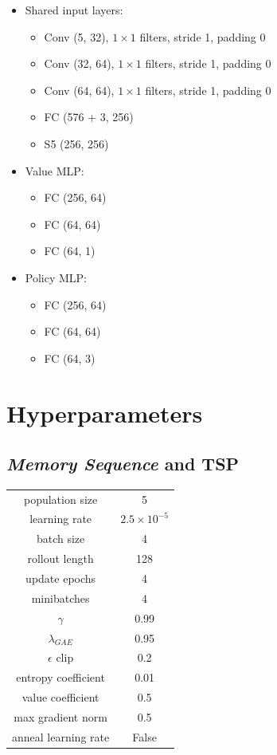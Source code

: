 \documentclass{article}
\begin{document}
\begin{itemize}
\item{Shared input layers:}
\begin{itemize}
\item{Conv (5, 32), $1 \times 1$ filters, stride 1, padding 0}
\item{Conv (32, 64), $1 \times 1$ filters, stride 1, padding 0}
\item{Conv (64, 64), $1 \times 1$ filters, stride 1, padding 0}
\item{FC (576 + 3, 256)}
\item{S5 (256, 256)}
\end{itemize}
\item{Value MLP:}
\begin{itemize}
\item{FC (256, 64)}
\item{FC (64, 64)}
\item{FC (64, 1)}
\end{itemize}
\item{Policy MLP:}
\begin{itemize}
\item{FC (256, 64)}
\item{FC (64, 64)}
\item{FC (64, 3)}
\end{itemize}
\end{itemize}

\newpage
\section{Hyperparameters}
\label{A:hparams}

\subsection{\textit{Memory Sequence} and TSP}

\begin{center}
\begin{tabular}{ c c }
 population size & 5 \\
 learning rate & $2.5 \times 10^{-5}$ \\ 
 batch size & 4 \\  
 rollout length & 128 \\
 update epochs & 4 \\
 minibatches & 4 \\
 $\gamma$ & 0.99 \\
 $\lambda_{GAE}$ & 0.95 \\
 $\epsilon$ clip & 0.2 \\
 entropy coefficient & 0.01 \\
 value coefficient & 0.5 \\
 max gradient norm & 0.5 \\
 anneal learning rate & False
\end{tabular}
\end{center}
\end{document}
